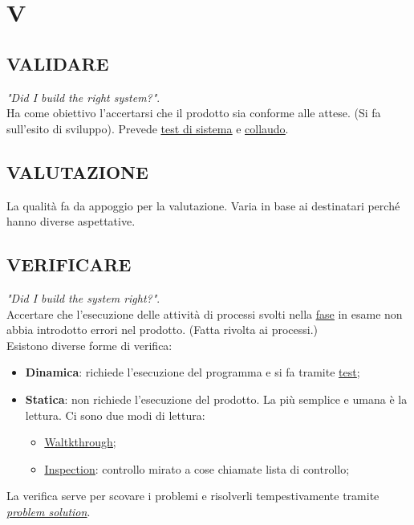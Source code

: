\newpage
	\flushright{\hyperref[index]{\color{black!65}{Ritorna all'indice}}}\flushleft
	\section{V} \label{sec:V}
	
		\subsection{VALIDARE}  \label{validare}
		\textit{"Did I build the right system?"}. \\ 
		Ha come obiettivo l'accertarsi che il prodotto sia conforme alle attese. (Si fa sull'esito di sviluppo). Prevede \underline{\hyperref[testsistema]{test di sistema}} e \underline{\hyperref[collaudo]{collaudo}}.
		
		\subsection{VALUTAZIONE}
		La qualità fa da appoggio per la valutazione. Varia in base ai destinatari perché hanno diverse aspettative.
		
		\subsection{VERIFICARE}  \label{verificare}
		\textit{"Did I build the system right?"}. \\
		Accertare che l'esecuzione delle attività di processi svolti nella \underline{\hyperref[fase]{fase}} in esame non abbia introdotto errori nel prodotto. (Fatta rivolta ai processi.) \\
		Esistono diverse forme di verifica:	%
		\begin{itemize}
			\item \textbf{Dinamica}: richiede l'esecuzione del programma e si fa tramite \underline{\hyperref[test]{test}};
			\item \textbf{Statica}: non richiede l'esecuzione del prodotto. La più semplice e umana è la lettura. 
			Ci sono due modi di lettura:
			\begin{itemize}
				\item \underline{\hyperref[walkthrough]{Waltkthrough}};
				\item \underline{\hyperref[inspection]{Inspection}}: controllo mirato a cose chiamate lista di controllo;
			\end{itemize}	
		\end{itemize}
		La verifica serve per scovare i problemi e risolverli tempestivamente tramite \textit{\underline{\hyperref[problemsolution]{problem solution}}}. 
		
